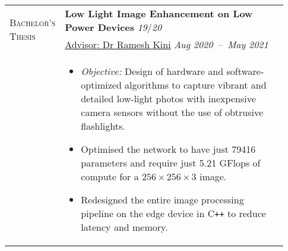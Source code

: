 \documentclass[letterpaper, 10pt, oneside]{article}
\newcommand{\stitle}[1]{\normalsize{\textsc{#1}}}
\newcommand{\bdit}[1]{{\textbf{#1}}}
\begin{document}
\begin{longtable}{@{} p{0.13\linewidth} p{0.8\linewidth}}
    \multirow{2}{6.5em}{\stitle{Bachelor's Thesis}}   & \bdit{Low Light Image Enhancement on Low Power Devices} \hfill \textsl{19}/\textsl{20}                                                                                                                \\
                                                      & \href{https://ece.nitk.ac.in/faculty/ramesh-kini-m}{Advisor: Dr Ramesh Kini} \hfill \textsl{Aug 2020\ --\ May 2021}                                                                                   \\
                                                      & \parbox{0.8\textwidth}{                                                                                                                                                                               %
        \begin{itemize}[leftmargin=*, itemsep=-0.70ex, topsep=-0.88ex]
            \item \textsl{Objective:} Design of hardware and software-optimized algorithms to capture vibrant and detailed low-light photos with inexpensive camera sensors without the use of obtrusive flashlights.
            \item Optimised the network to have just 79416 parameters and require just 5.21 GFlops of compute for a $256\times 256 \times 3$ image.
            \item Redesigned the entire image processing pipeline on the edge device in C\texttt{++} to reduce latency and memory.
        \end{itemize}
    }
    \\
    \\


\end{longtable}
\end{document}
